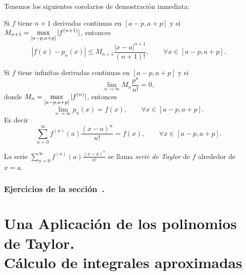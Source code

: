 Tenemos los siguientes corolarios de demostración inmediata:

\begin{corollary}
 Si $f$ tiene $n+1$ derivadas continuas en $[a-p,a+p]$ y si $\displaystyle M_{n+1} = \max_{[a-p,a+p]} |f^{(n+1)}|$, entonces
\[
 |f(x) - p_n(x) | \le M_{n+1} \frac{|x-a|^{n+1}}{(n+1)!},\qquad \forall x \in [a-p,a+p].
\]
\end{corollary}

\begin{corollary}
 Si $f$ tiene infinitas derivadas continuas en $[a-p,a+p]$ y si 
\[
 \lim_{n\to\infty} M_n \frac{p^n}{n!} = 0,
\]
donde $\displaystyle M_n = \max_{[a-p,a+p]} |f^{(n)}|$, entonces
\[
\lim_{n\to\infty} p_n(x) = f(x),\qquad \forall x \in [a-p,a+p].
\]
Es decir
\[
\sum_{n=0}^\infty f^{(n)}(a) \frac{(x-a)^n}{n!} = f(x), \qquad \forall x \in [a-p,a+p].
\]
\end{corollary}

\begin{definition}
 La serie $\sum_{n=0}^\infty f^{(n)}(a) \frac{(x-a)^n}{n!}$ se llama \emph{serie de Taylor} de $f$ alrededor de $x=a$.
\end{definition}



\subsubsection*{Ejercicios de la sección~.}

\begin{enumerate}

\end{enumerate}

\section{Una Aplicación de los polinomios de Taylor.\\ Cálculo de integrales aproximadas}



